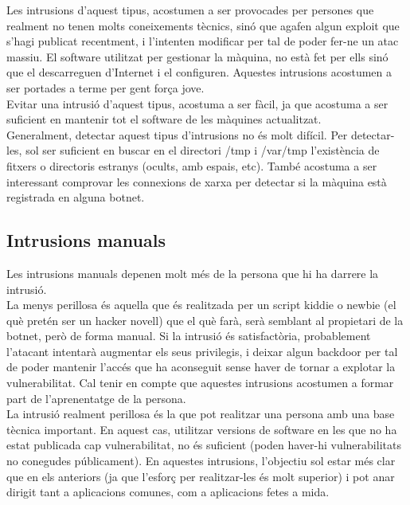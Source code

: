 Les intrusions d'aquest tipus, acostumen a ser provocades per persones que realment no tenen molts coneixements tècnics, sinó que 
agafen algun exploit que s'hagi publicat recentment, i l'intenten modificar per tal de poder fer-ne un atac massiu. El
software utilitzat per gestionar la màquina, no està fet per ells sinó que el descarreguen d'Internet i el configuren. 
Aquestes intrusions acostumen a ser portades a terme per gent força jove. \\

Evitar una intrusió d'aquest tipus, acostuma a ser fàcil, ja que 
acostuma a ser suficient en mantenir tot el software de les màquines actualitzat. \\

Generalment, detectar aquest tipus d'intrusions no és molt difícil. Per detectar-les, sol ser suficient en buscar en el directori /tmp i /var/tmp
l'existència de fitxers o directoris estranys (ocults, amb espais, etc). També acostuma a ser interessant comprovar 
les connexions de xarxa per detectar si la màquina està registrada en alguna botnet. \\

\subsection{Intrusions manuals}

Les intrusions manuals depenen molt més de la persona que hi ha darrere la intrusió. \\

La menys perillosa és aquella que és realitzada per un script kiddie o newbie (el què pretén ser un hacker novell) que 
el què farà, serà semblant al propietari de la botnet, però de forma manual. Si la intrusió és satisfactòria, probablement
l'atacant intentarà augmentar els seus privilegis, i deixar algun backdoor per tal de poder mantenir l'accés que ha aconseguit
sense haver de tornar a explotar la vulnerabilitat. Cal tenir en compte que aquestes intrusions acostumen a formar part
de l'aprenentatge de la persona. \\

La intrusió realment perillosa és la que pot realitzar una persona amb una base tècnica important. En aquest cas, utilitzar
versions de software en les que no ha estat publicada cap vulnerabilitat, no és suficient (poden haver-hi vulnerabilitats
no conegudes públicament). En aquestes intrusions, l'objectiu sol estar més clar que en els anteriors (ja que 
l'esforç per realitzar-les és molt superior) i pot anar dirigit tant a aplicacions comunes, com a aplicacions fetes a mida. \\

